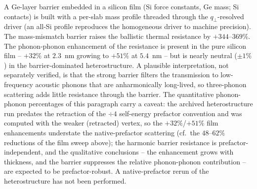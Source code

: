 A Ge-layer barrier embedded in a silicon film (Si force constants,
Ge mass; Si contacts) is built with a per-slab mass profile threaded
through the $q_\perp$-resolved driver (an all-Si profile reproduces the
homogeneous driver to machine precision). The mass-mismatch barrier
raises the ballistic thermal resistance by $+344$--$369\%$.
The phonon-phonon enhancement of the resistance is present in the pure
silicon film -- $+32\%$ at $2.3$~nm growing to $+51\%$ at $5.4$~nm -- but is
nearly neutral ($\pm1\%$) in the barrier-dominated heterostructure. A
plausible interpretation, not separately verified, is that the strong
barrier filters the transmission to low-frequency acoustic phonons that are
anharmonically long-lived, so three-phonon scattering adds little resistance
through the barrier.
The quantitative phonon-phonon percentages of this paragraph carry a caveat:
the archived heterostructure run predates the retraction of the $\div4$
self-energy prefactor convention and was computed with the weaker (retracted)
vertex, so the $+32\%$/$+51\%$ film enhancements understate the
native-prefactor scattering (cf.\ the $48$--$62\%$ reductions of the film
sweep above); the harmonic barrier resistance is prefactor-independent, and
the qualitative conclusions -- the enhancement grows with thickness, and the
barrier suppresses the relative phonon-phonon contribution -- are expected to
be prefactor-robust. A native-prefactor rerun of the heterostructure has not
been performed.


